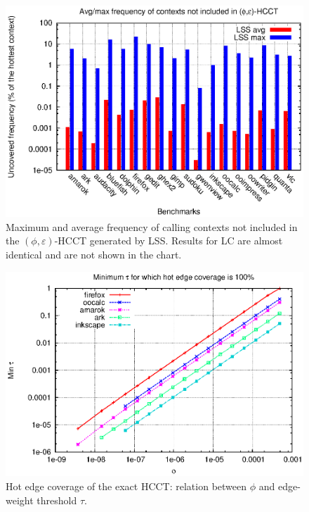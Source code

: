 \documentclass{sigplanconf}
\begin{document}
\begin{figure}[t]
\center\includegraphics[width=\columnwidth]{charts/avg-max-uncovered.eps}
\caption{Maximum and average frequency of calling contexts not included in the $(\phi,\varepsilon)$-HCCT generated by LSS. Results for LC are almost identical and are not shown in the chart.}
\label{fig:frequencyUncovered}
\end{figure} 

\begin{figure}[t]
\center\includegraphics[width=\columnwidth]{charts/mintau.eps}
\caption{Hot edge coverage of the exact HCCT: relation between $\phi$ and edge-weight threshold $\tau$.}
\label{fig:hotEdgeCoverage}
\end{figure} 
\end{document}
